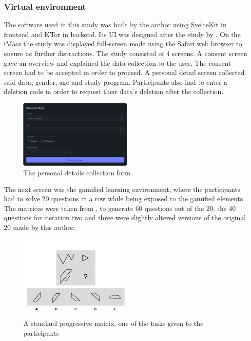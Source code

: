 \subsubsection{Virtual environment}
The software used in this study was built by the author using SvelteKit in frontend and KTor in backend. Its UI was designed after the study by \textcite{albuquerqueDoesGenderStereotype2017}.
On the iMacs the study was displayed full-screen mode using the Safari web browser to ensure no further distractions. The study consisted of 4 screens.
A consent screen gave an overview and explained the data collection to the user. The consent screen had to be accepted in order to proceed.
A personal detail screen collected said data; gender, age and study program. Participants also had to enter a deletion code in order to request their data's deletion after the collection.
\begin{figure}[H]
  \centering
  \includegraphics[width=0.5\textwidth]{img/details.png}
  \caption{The personal details collection form}
  \label{fig:figureDetails}
\end{figure}
The next screen was the gamified learning environment, where the participants had to solve 20 questions in a row while being exposed to the gamified elements.
The matrices were taken from \textcite{albuquerqueDoesGenderStereotype2017}, to generate 60 questions out of the 20, the 40 questions for iteration two and three were slightly altered versions of the original 20 made by this author.
\begin{figure}[H]
  \centering
  \includegraphics[width=0.5\textwidth]{img/q-17.png}
  \caption{A standard progressive matrix, one of the tasks given to the participants}
  \label{fig:figureMatrix}
\end{figure}
